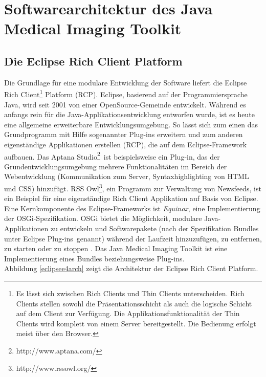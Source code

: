 \chapter{Softwarearchitektur des Java Medical Imaging Toolkit} \label{architecture}

\section{Die Eclipse Rich Client Platform}

Die Grundlage für eine modulare Entwicklung der Software liefert die Eclipse Rich Client\footnote{Es lässt sich zwischen Rich Clients und Thin Clients unterscheiden. Rich Clients stellen sowohl die Präsentationsschicht als auch die logische Schicht auf dem Client zur Verfügung. Die Applikationsfunktionalität der Thin Clients wird komplett von einem Server bereitgestellt. Die Bedienung erfolgt meist über den Browser.} Platform (RCP). Eclipse, basierend auf der Programmiersprache Java, wird seit 2001 von einer OpenSource-Gemeinde entwickelt\cite{vogel:eclipseoverview}. Während es anfangs rein für die Java-Applikationsentwicklung entworfen wurde, ist es heute eine allgemeine erweiterbare Entwicklungsumgebung. So lässt sich zum einen das Grundprogramm mit Hilfe sogenannter Plug-ins erweitern und zum anderen eigenständige Applikationen erstellen (RCP), die auf dem Eclipse-Framework aufbauen. Das \glqq Aptana Studio\footnote{http://www.aptana.com/}\grqq\ ist beispielsweise ein Plug-in, das der Grundentwicklungsumgebung mehrere Funktionalitäten im Bereich der Webentwicklung (Kommunikation zum Server, Syntaxhighlighting von HTML und CSS) hinzufügt. RSS Owl\footnote{http://www.rssowl.org/}, ein Programm zur Verwaltung von Newsfeeds, ist ein Beispiel für eine eigenständige Rich Client Applikation auf Basis von Eclipse.\\
Eine Kernkomponente des Eclipse-Frameworks ist \textit{Equinox}, eine Implementierung der OSGi-Spezifikation. OSGi bietet die Möglichkeit, modulare Java-Applikationen zu entwickeln und Softwarepakete (nach der Spezifikation \glqq Bundles\grqq\, unter Eclipse \glqq Plug-ins\grqq\ genannt) während der Laufzeit hinzuzufügen, zu entfernen, zu starten oder zu stoppen \cite{vogel:e4overview}. Das Java Medical Imaging Toolkit ist eine Implementierung eines Bundles beziehungsweise Plug-ins.\\
Abbildung \ref{eclipsee4arch} zeigt die Architektur der Eclipse Rich Client Platform.


